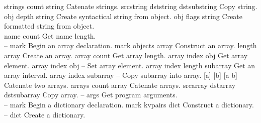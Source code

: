 \begin{longtable}{}
	{strings count}
	{{\bf {}}}
	{string}
	{Catenate strings.}
\hline
\optableent
	{srcstring dststring}
	{{\bf {}}}
	{dstsubstring}
	{Copy string.}
\hline
\optableent
	{obj depth}
	{{\bf {}}}
	{string}
	{Create syntactical string from object.}
\hline
\optableent
	{obj flags}
	{{\bf {}}}
	{string}
	{Create formatted string from object.}
\hline \hline
{} \\
\hline \hline
\optableent
	{name}
	{{\bf {}}}
	{count}
	{Get name length.}
\hline \hline
{} \\
\hline \hline
\optableent
	{--}
	{{\bf \htmlref{[}{systemdict:sym_lb}}}
	{mark}
	{Begin an array declaration.}
\hline
\optableent
	{mark objects}
	{{\bf \htmlref{]}{systemdict:sym_rb}}}
	{array}
	{Construct an array.}
\hline
\optableent
	{length}
	{{\bf {}}}
	{array}
	{Create an array.}
\hline
\optableent
	{array}
	{{\bf {}}}
	{count}
	{Get array length.}
\hline
\optableent
	{array index}
	{{\bf {}}}
	{obj}
	{Get array element.}
\hline
\optableent
	{array index obj}
	{{\bf {}}}
	{--}
	{Set array element.}
\hline
\optableent
	{array index length}
	{{\bf {}}}
	{subarray}
	{Get an array interval.}
\hline
\optableent
	{array index subarray}
	{{\bf {}}}
	{--}
	{Copy subarray into array.}
\hline
\optableent
	{[a] [b]}
	{{\bf {}}}
	{[a b]}
	{Catenate two arrays.}
\hline
\optableent
	{arrays count}
	{{\bf {}}}
	{array}
	{Catenate arrays.}
\hline
\optableent
	{srcarray dstarray}
	{{\bf {}}}
	{dstsubarray}
	{Copy array.}
\hline
\optableent
	{--}
	{{\bf {}}}
	{args}
	{Get program arguments.}
\hline \hline
{} \\
\hline \hline
\optableent
	{--}
	{{\bf {}}}
	{mark}
	{Begin a dictionary declaration.}
\hline
\optableent
	{mark kvpairs}
	{{\bf {}}}
	{dict}
	{Construct a dictionary.}
\hline
\optableent
	{--}
	{{\bf {}}}
	{dict}
	{Create a dictionary.}

\end{longtable}
